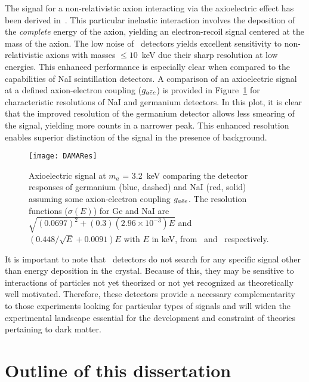 
	The signal for a non-relativistic axion interacting via the axioelectric effect has been derived in~\cite{Pospelov:2008jk}.  This particular inelastic interaction involves the deposition of the \emph{complete} energy of the axion, yielding an electron-recoil signal centered at the mass of the axion.  The low noise of \ppc~detectors yields excellent sensitivity to non-relativistic axions with masses $\leq10$~keV due their sharp resolution at low energies.  This enhanced performance is especially clear when compared to the capabilities of NaI scintillation detectors.  A comparison of an axioelectric signal at a defined axion-electron coupling ($g_{a\bar{e}e}$) is provided in Figure~\ref{fig:ResCompare} for characteristic resolutions of NaI and germanium detectors.  In this plot, it is clear that the improved resolution of the germanium detector allows less smearing of the signal, yielding more counts in a narrower peak.  This enhanced resolution enables superior distinction of the signal in the presence of background.
	
		\begin{figure}
			\centering
			\texttt{[image: DAMARes]}
			\caption[Axioelectric signal at $m_{a}$ = 3.2~keV]{Axioelectric signal at $m_{a}$ = 3.2~keV comparing 
			the detector responses of germanium (blue, dashed) and NaI (red, solid) assuming some axion-electron coupling $g_{a\bar{e}e}$.  The resolution functions ($\sigma(E)$) for Ge and NaI are $\sqrt{(0.0697)^{2} + (0.3)(2.96\times10^{-3})E}$ and
			$(0.448/\sqrt{E} + 0.0091) E$ with $E$ in keV, from~\cite{Aalseth:2008aa} and~\cite{Bernabei2008297} respectively.} 
			\label{fig:ResCompare}
		\end{figure}
	
	It is important to note that \ppc~detectors do not search for any specific signal other than energy deposition in the crystal.
Because of this, they may be sensitive to interactions of particles not yet theorized or not yet recognized as theoretically 
well motivated.  Therefore, these detectors provide a necessary complementarity to those experiments looking for particular types
of signals and will widen the experimental landscape essential for the development and constraint of theories pertaining to dark matter.

	\section{Outline of this dissertation}

